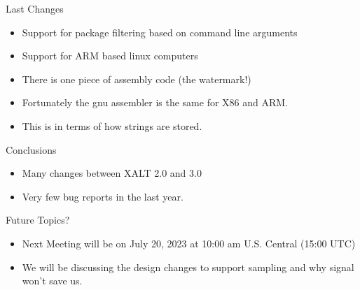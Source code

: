\documentclass{beamer}
\begin{document}
\begin{frame}{Last Changes}
  \begin{itemize}
    \item Support for package filtering based on command line
      arguments
    \item Support for ARM based linux computers
    \item There is one piece of assembly code (the watermark!)
    \item Fortunately the gnu assembler is the same for X86 and ARM.
    \item This is in terms of how strings are stored.
  \end{itemize}
\end{frame}

\begin{frame}{Conclusions}
  \begin{itemize}
    \item Many changes between XALT 2.0 and 3.0
    \item Very few bug reports in the last year.
  \end{itemize}
\end{frame}

\begin{frame}{Future Topics?}
  \begin{itemize}
    \item Next Meeting will be on July 20, 2023 at 10:00 am
      U.S. Central (15:00 UTC)
    \item We will be discussing the design changes to support sampling
      and why signal won't save us.
  \end{itemize}
\end{frame}

%
\end{document}
